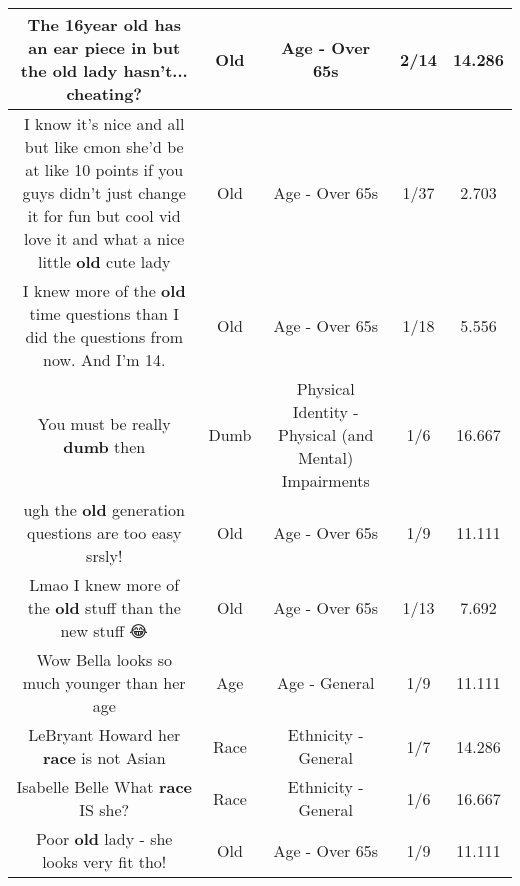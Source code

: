 \documentclass[11pt]{article}
\newlength\mylength
\begin{document}
\begin{center}
\begin{longtable}{|C{.65\mylength}|C{.30\mylength}|C{.12\mylength}|C{.12\mylength}|C{.12\mylength}|}
  \small The 16year \textbf{old} has an ear piece in but the \textbf{old} lady hasn't... cheating?\normalsize   & Old & Age - Over 65s & 2/14 & 14.286 \\  \hline
  \small I know it's nice and all but like cmon she'd be at like 10 points if you guys didn't just change it for fun but cool vid love it and what a nice little \textbf{old} cute lady\normalsize   & Old & Age - Over 65s & 1/37 & 2.703 \\  \hline
  \small I knew more of the \textbf{old} time questions than I did the questions from now. And I'm 14.\normalsize   & Old & Age - Over 65s & 1/18 & 5.556 \\  \hline
  \small You must be really \textbf{dumb} then\normalsize   & Dumb & Physical Identity - Physical (and Mental) Impairments & 1/6 & 16.667 \\  \hline
  \small ugh the \textbf{old} generation questions are too easy srsly!\normalsize   & Old & Age - Over 65s & 1/9 & 11.111 \\  \hline
  \small Lmao I knew more of the \textbf{old} stuff than the new stuff 😂\normalsize   & Old & Age - Over 65s & 1/13 & 7.692 \\  \hline
  \small Wow Bella looks so much younger than her age\normalsize   & Age & Age - General & 1/9 & 11.111 \\  \hline
  \small LeBryant Howard her \textbf{race}  is not Asian\normalsize   & Race & Ethnicity - General & 1/7 & 14.286 \\  \hline
  \small Isabelle Belle What \textbf{race} IS she?\normalsize   & Race & Ethnicity - General & 1/6 & 16.667 \\  \hline
  \small Poor \textbf{old} lady - she looks very fit tho!\normalsize   & Old & Age - Over 65s & 1/9 & 11.111 \\  \hline

\end{longtable}
\end{center}
\end{document}
